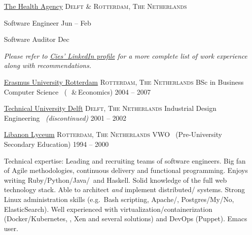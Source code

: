 \documentclass[10pt,a4paper]{article}
\begin{document}

\headedsection
  {
    \href{http://www.thehealthagency.com}{The Health Agency}
  }
  {\textsc{Delft \& Rotterdam, The Netherlands}} {%

  \headedsubsection
    {Software Engineer}
    {Jun  -- Feb }
    {}

  \headedsubsection
    {Software Auditor}
    {Dec }
    {}
}

\vspace{-0.2em}
\begin{center}
  \emph{\small Please refer to \href{http://www.linkedin.com/in/ciesbreijs}{Cies' LinkedIn profile} for a more complete list of work experience along with recommendations.}
\end{center}


\spacedhrule{-0.2em}{-0.4em}


\headedsection
  {\href{http://www.eur.nl/english}{Erasmus University Rotterdam}}
  {\textsc{Rotterdam, The Netherlands}} {%
  \headedsubsection
    {BSc in Business Computer Science \textnormal{~(~\,\&\,Economics)}}
    {2004 -- 2007}
    {}
}

\headedsection
  {\href{http://www.tudelft.nl/en}{Technical University Delft}}
  {\textsc{Delft, The Netherlands}} {%
  \headedsubsection
    {Industrial Design Engineering \textnormal{\textit{~(discontinued)}}}
    {2001 -- 2002} {}
}

\headedsection
  {\href{http://www.libanonlyceum.nl}{Libanon Lyceum}}
  {\textsc{Rotterdam, The Netherlands}} {%
  \headedsubsection
    {VWO \textnormal{~(Pre-University Secondary Education)}}
    {1994 -- 2000} {}
}


\spacedhrule{0.5em}{-0.4em}


\inlineheadsection  %
  {Technical expertise:}
  {Leading and recruiting teams of software engineers.  Big fan of Agile methodologies, continuous delivery and functional programming.  Enjoys writing Ruby/\nsp Python/\nsp Java/\nsp \CPP~and Haskell.  Solid knowledge of the full web technology stack.  Able to architect \textit{and} implement distributed/ systems.  Strong Linux administration skills (e.g.\ Bash scripting, Apache/, Postgres/My/No, ElasticSearch).  Well experienced with virtualization/containerization (Docker/Kubernetes, , Xen and several  solutions) and DevOps (Puppet).  Emacs user.}
\end{document}
